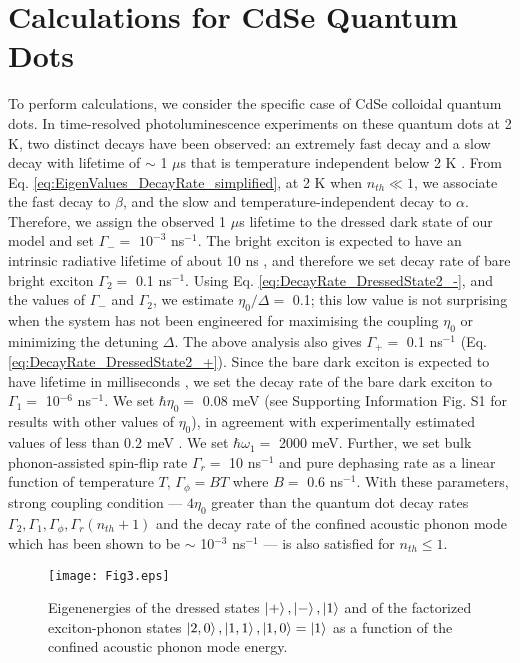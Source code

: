 \documentclass[aps,pra,preprint,groupedaddress]{revtex4-1}
\begin{document}
\section*{Calculations for CdSe Quantum Dots} 
To perform calculations, we consider the specific case of CdSe colloidal quantum dots\cite{Crooker2003,DeMelloDonega2006,Biadala2009}. In time-resolved photoluminescence experiments on these quantum dots at 2 K, two distinct decays have been observed: an extremely fast decay and a slow decay with lifetime of $\sim$ 1 $\mu$s that is temperature independent below 2 K \cite{Crooker2003,DeMelloDonega2006,Biadala2009}. From Eq. \ref{eq:EigenValues_DecayRate_simplified}, at 2 K when $n_{th} \ll 1$, we associate the fast decay to $\beta$, and the slow and temperature-independent decay to $\alpha$. Therefore, we assign the observed 1 $\mu$s lifetime to the dressed dark state of our model and set $\Gamma_- =$ $10^{-3}$ ns$^{-1}$. The bright exciton is expected to have an intrinsic radiative lifetime of about 10 ns \cite{Califano2005, Labeau2003}, and therefore we set decay rate of bare bright exciton $\Gamma_2 =$ 0.1 ns$^{-1}$. Using Eq. \ref{eq:DecayRate_DressedState2_-}, and the values of $\Gamma_-$ and $\Gamma_2$, we estimate $\eta_0/\Delta =$ 0.1; this low value is not surprising when the system has not been engineered for maximising the coupling $\eta_0$ or minimizing the detuning $\Delta$. The above analysis also gives $\Gamma_+ =$ 0.1 ns$^{-1}$ (Eq. \ref{eq:DecayRate_DressedState2_+}). Since the bare dark exciton is expected to have lifetime in milliseconds \cite{Califano2007}, we set the decay rate of the bare dark exciton to $\Gamma_1 =$ 10$^{-6}$ ns$^{-1}$. We set $\hbar\eta_0 =$ 0.08 meV (see Supporting Information Fig. S1 for results with other values of $\eta_0$), in agreement with experimentally estimated values of less than $0.2$ meV \cite{Sagar2008,Krauss1997}. We set $\hbar\omega_{1} =$ 2000 meV. Further, we set bulk phonon-assisted spin-flip rate $\Gamma_r =$ 10 ns$^{-1}$ and pure dephasing rate as a linear function of temperature $T$, $\Gamma_{\phi} = BT$ where $B =$ 0.6 ns$^{-1}$\cite{Biadala2009,Takagahara1996, Masia2012}. With these parameters, strong coupling condition --- $4\eta_0$ greater than the quantum dot decay rates $\Gamma_2, \Gamma_1, \Gamma_{\phi}, \Gamma_r(n_{th}+1)$ and the decay rate of the confined acoustic phonon mode which has been shown to be $\sim$ 10$^{-3}$ ns$^{-1}$ \cite{bron2013nonequilibrium, Spann2013} --- is also satisfied for $n_{th} \leq 1$.


\begin{figure}[htbp]
\centering\texttt{[image: Fig3.eps]}
\caption{Eigenenergies of the dressed states $\ket{+}, \ket{-}, \ket{1}$ and of the factorized exciton-phonon states $\ket{2,0}, \ket{1,1}, \ket{1,0} = \ket{1}$ as a function of the confined acoustic phonon mode energy.}
\label{Fig:Anti_Crossing}
\end{figure}
\end{document}
